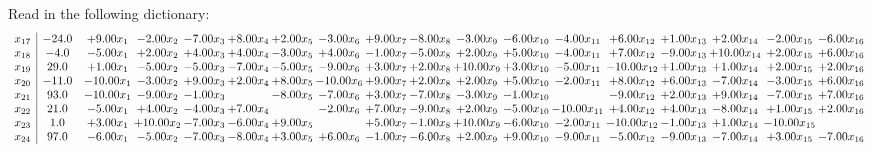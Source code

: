\documentclass[9pt]{article}
\begin{document}
Read in the following dictionary:
\[\begin{array}{c| c c@{\hskip 2pt} c@{\hskip 2pt} c@{\hskip 2pt} c@{\hskip 2pt} c@{\hskip 2pt} c@{\hskip 2pt} c@{\hskip 2pt} c@{\hskip 2pt} c@{\hskip 2pt} c@{\hskip 2pt} c@{\hskip 2pt} c@{\hskip 2pt} c@{\hskip 2pt} c@{\hskip 2pt} c@{\hskip 2pt} c@{\hskip 2pt} }
 x_{17}   &  -24.0 & +  9.00 x_{1} & -2.00 x_{2} & -7.00 x_{3} & +  8.00 x_{4} & +  2.00 x_{5} & -3.00 x_{6} & +  9.00 x_{7} & -8.00 x_{8} & -3.00 x_{9} & -6.00 x_{10} & -4.00 x_{11} & +  6.00 x_{12} & +  1.00 x_{13} & +  2.00 x_{14} & -2.00 x_{15} & -6.00 x_{16}\\
 x_{18}   &  -4.0 & -5.00 x_{1} & +  2.00 x_{2} & +  4.00 x_{3} & +  4.00 x_{4} & -3.00 x_{5} & +  4.00 x_{6} & -1.00 x_{7} & -5.00 x_{8} & +  2.00 x_{9} & +  5.00 x_{10} & -4.00 x_{11} & +  7.00 x_{12} & -9.00 x_{13} & + 10.00 x_{14} & +  2.00 x_{15} & +  6.00 x_{16}\\
 x_{19}   &  29.0 & +  1.00 x_{1} & -5.00 x_{2} & -5.00 x_{3} & -7.00 x_{4} & -5.00 x_{5} & -9.00 x_{6} & +  3.00 x_{7} & +  2.00 x_{8} & + 10.00 x_{9} & +  3.00 x_{10} & -5.00 x_{11} & -10.00 x_{12} & +  1.00 x_{13} & +  1.00 x_{14} & +  2.00 x_{15} & +  2.00 x_{16}\\
 x_{20}   &  -11.0 & -10.00 x_{1} & -3.00 x_{2} & +  9.00 x_{3} & +  2.00 x_{4} & +  8.00 x_{5} & -10.00 x_{6} & +  9.00 x_{7} & +  2.00 x_{8} & +  2.00 x_{9} & +  5.00 x_{10} & -2.00 x_{11} & +  8.00 x_{12} & +  6.00 x_{13} & -7.00 x_{14} & -3.00 x_{15} & +  6.00 x_{16}\\
 x_{21}   &  93.0 & -10.00 x_{1} & -9.00 x_{2} & -1.00 x_{3} &   & -8.00 x_{5} & -7.00 x_{6} & +  3.00 x_{7} & -7.00 x_{8} & -3.00 x_{9} & -1.00 x_{10} &   & -9.00 x_{12} & +  2.00 x_{13} & +  9.00 x_{14} & -7.00 x_{15} & +  7.00 x_{16}\\
 x_{22}   &  21.0 & -5.00 x_{1} & +  4.00 x_{2} & -4.00 x_{3} & +  7.00 x_{4} &   & -2.00 x_{6} & +  7.00 x_{7} & -9.00 x_{8} & +  2.00 x_{9} & -5.00 x_{10} & -10.00 x_{11} & +  4.00 x_{12} & +  4.00 x_{13} & -8.00 x_{14} & +  1.00 x_{15} & +  2.00 x_{16}\\
 x_{23}   &  1.0 & +  3.00 x_{1} & + 10.00 x_{2} & -7.00 x_{3} & -6.00 x_{4} & +  9.00 x_{5} &   & +  5.00 x_{7} & -1.00 x_{8} & + 10.00 x_{9} & -6.00 x_{10} & -2.00 x_{11} & -10.00 x_{12} & -1.00 x_{13} & +  1.00 x_{14} & -10.00 x_{15} &   \\
 x_{24}   &  97.0 & -6.00 x_{1} & -5.00 x_{2} & -7.00 x_{3} & -8.00 x_{4} & +  3.00 x_{5} & +  6.00 x_{6} & -1.00 x_{7} & -6.00 x_{8} & +  2.00 x_{9} & +  9.00 x_{10} & -9.00 x_{11} & -5.00 x_{12} & -9.00 x_{13} & -7.00 x_{14} & +  3.00 x_{15} & -7.00 x_{16}\\

\end{array}\]
\end{document}
